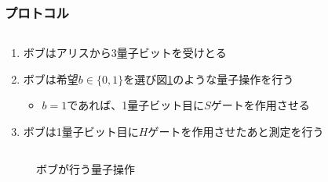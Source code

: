 \begin{frame}
  \frametitle{プロトコル}

  \begin{columns}
    \begin{column}{0.6\textwidth}
      \begin{enumerate}
        \item ボブはアリスから3量子ビットを受けとる
        
        \item ボブは希望$b \in \{0, 1\}$を選び図\ref{fig:bob_circuit}のような量子操作を行う
        \begin{itemize}
          \item $b = 1$であれば、1量子ビット目に$S$ゲートを作用させる
        \end{itemize}

        \item ボブは1量子ビット目に$H$ゲートを作用させたあと測定を行う
      \end{enumerate}
    \end{column}
    \begin{column}{0.4\textwidth}
      \begin{table}[h]
        \CovertTable
      \end{table}
    \end{column}
  \end{columns}

  \begin{figure}
    \centering
    \caption{ボブが行う量子操作}
    \label{fig:bob_circuit}
  \end{figure}
\end{frame}

